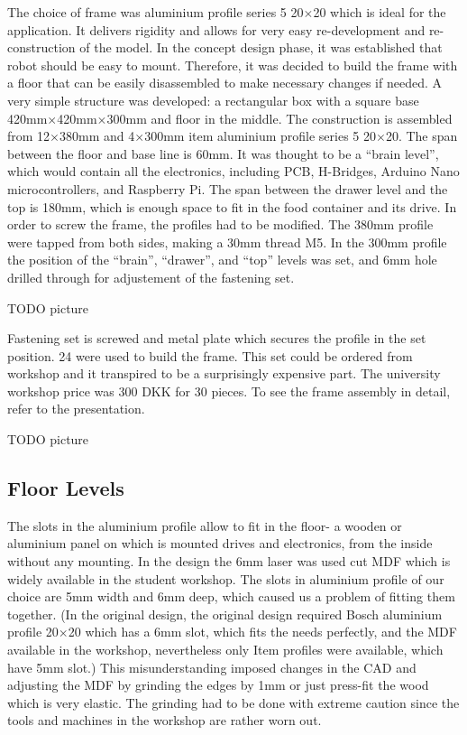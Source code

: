 \documentclass[11pt]{article}
\begin{document}
The choice of frame was aluminium profile series 5 20$\times$20 which is ideal for the application. It delivers rigidity and allows for very easy re-development and re-construction of the model. In the concept design phase, it was established that robot should be easy to mount. Therefore, it was decided to build the frame with a floor that can be easily disassembled to make necessary changes if needed. A very simple structure was developed: a rectangular box with a square base 420mm$\times$420mm$\times$300mm and floor in the middle. The construction is assembled from 12$\times$380mm and 4$\times$300mm item aluminium profile series 5 20$\times$20.  The span between the floor and base line is 60mm. It was thought to be a ``brain level'', which would contain all the electronics, including PCB, H-Bridges, Arduino Nano microcontrollers, and Raspberry Pi. The span between the drawer level and the top is 180mm, which is enough space to fit in the food container and its drive. In order to screw the frame, the profiles had to be modified. The 380mm profile were tapped from both sides, making a 30mm thread M5. In the 300mm profile the position of the ``brain'', ``drawer'', and ``top'' levels was set, and 6mm hole drilled through for adjustement of the fastening set.

TODO picture

Fastening set is screwed and metal plate which secures the profile in the set position. 24 were used to build the frame. This set could be ordered from workshop and it transpired to be a surprisingly expensive part. The university workshop price was 300 DKK for 30 pieces. To see the frame assembly in detail, refer to the presentation.

TODO picture

\subsection*{Floor Levels}

The slots in the aluminium profile allow to fit in the floor- a wooden or aluminium panel on which is mounted drives and electronics, from the inside without any mounting. In the design the 6mm laser was used cut MDF which is widely available in the student workshop. The slots in aluminium profile of our choice are 5mm width and 6mm deep, which caused us a problem of fitting them together. (In the original design, the original design required Bosch aluminium profile 20$\times$20 which has a 6mm slot, which fits the needs perfectly, and the MDF available in the workshop, nevertheless only Item profiles were available, which have 5mm slot.) This misunderstanding imposed changes in the CAD and adjusting the MDF by grinding the edges by 1mm or just press-fit the wood which is very elastic. The grinding had to be done with extreme caution since the tools and machines in the workshop are rather worn out.
\end{document}
